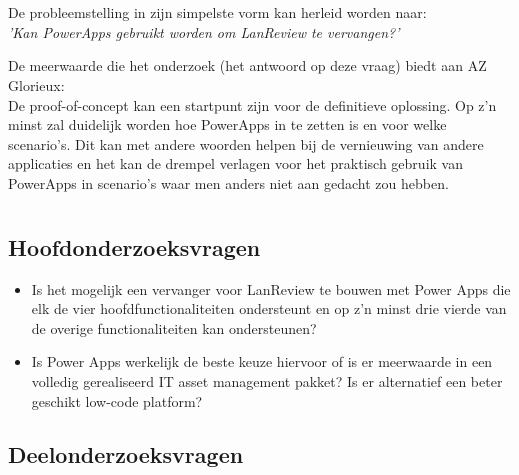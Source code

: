 \section{}
\label{sec:probleemstelling}

De probleemstelling in zijn simpelste vorm kan herleid worden naar:\\
\textit{'Kan PowerApps gebruikt worden om LanReview te vervangen?'}

De meerwaarde die het onderzoek (het antwoord op deze vraag) biedt aan AZ Glorieux:\\
De proof-of-concept kan een startpunt zijn voor de definitieve oplossing. Op z'n minst zal duidelijk worden hoe PowerApps in te zetten is en voor welke scenario's. Dit kan met andere woorden helpen bij de vernieuwing van andere applicaties en het kan de drempel verlagen voor het praktisch gebruik van PowerApps in scenario's waar men anders niet aan gedacht zou hebben.

\section{}
\label{sec:onderzoeksvraag}

\subsection{Hoofdonderzoeksvragen}

\begin{itemize}
    \item Is het mogelijk een vervanger voor LanReview te bouwen met Power Apps die elk de vier hoofdfunctionaliteiten ondersteunt en op z'n minst drie vierde van de overige functionaliteiten kan ondersteunen?
    \item Is Power Apps werkelijk de beste keuze hiervoor of is er meerwaarde in een volledig gerealiseerd IT asset management pakket? Is er alternatief een beter geschikt low-code platform?
\end{itemize}

\subsection{Deelonderzoeksvragen}

